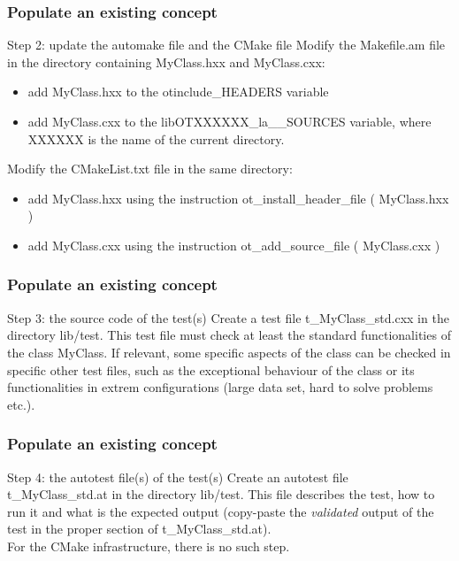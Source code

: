 \documentclass[8pt]{beamer}
\begin{document}
\begin{frame}
  \frametitle{Populate an existing concept}
  \begin{block}{Step 2: update the automake file and the CMake file}
    Modify the Makefile.am file in the directory containing MyClass.hxx and MyClass.cxx:
    \begin{itemize}
    \item add MyClass.hxx to the {\ttfamily otinclude\_HEADERS} variable
    \item add MyClass.cxx to the {\ttfamily libOTXXXXXX\_la\_\_SOURCES} variable, where XXXXXX is the name of the current directory.
    \end{itemize}
    Modify the CMakeList.txt file in the same directory:
    \begin{itemize}
    \item add MyClass.hxx using the instruction {\ttfamily ot\_install\_header\_file ( MyClass.hxx )}
    \item add MyClass.cxx using the instruction {\ttfamily ot\_add\_source\_file ( MyClass.cxx )}
    \end{itemize}
  \end{block}
\end{frame}
\begin{frame}
  \frametitle{Populate an existing concept}
  \begin{block}{Step 3: the source code of the test(s)}
    Create a test file t\_MyClass\_std.cxx in the directory lib/test. This test file must check at least the standard functionalities of the class MyClass. If relevant, some specific aspects of the class can be checked in specific other test files, such as the exceptional behaviour of the class or its functionalities in extrem configurations (large data set, hard to solve problems etc.).
  \end{block}
\end{frame}
\begin{frame}
  \frametitle{Populate an existing concept}
  \begin{block}{Step 4: the autotest file(s) of the test(s)}
    Create an autotest file t\_MyClass\_std.at in the directory lib/test. This file describes the test, how to run it and what is the expected output (copy-paste the \emph{validated} output of the test in the proper section of t\_MyClass\_std.at).\\
    For the CMake infrastructure, there is no such step.
  \end{block}
\end{frame}
\end{document}
